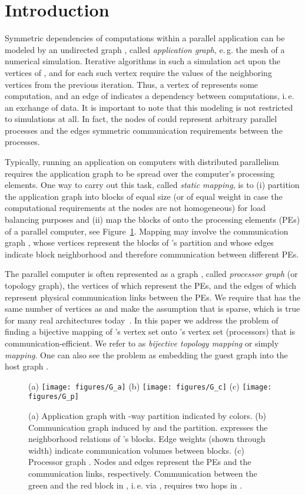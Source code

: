 \documentclass[pdftex]{llncs}
\newcommand{\eg}{e.\,g.\xspace}
\newcommand{\ie}{i.\,e.\xspace}
\begin{document}
\section{Introduction}
\label{sec:intro}
Symmetric dependencies of computations within a parallel application can be modeled by an
undirected graph , called \emph{application graph}, \eg the
mesh of a numerical simulation. Iterative algorithms in such a
simulation act upon the vertices of , and for each such vertex
require the values of the neighboring vertices from the previous
iteration. Thus, a vertex of  represents some computation, and an
edge of  indicates a dependency between computations, \ie
an exchange of data. It is important to note that this modeling is not restricted 
to simulations at all. In fact, the nodes of  could represent arbitrary parallel processes
and the edges symmetric communication requirements between the processes.

Typically, running an application on computers with distributed parallelism requires the application graph to be spread over 
the computer's processing elements. One
way to carry out this task, called \emph{static mapping}, is to (i)
partition the application graph  into blocks of equal size (or of equal weight
in case the computational requirements at the nodes are not homogeneous) for
load balancing purposes and (ii) map the blocks of  onto the
processing elements (PEs) of a parallel computer, see
Figure~\ref{fig:overview}. 
Mapping may involve the communication
graph , whose vertices represent the blocks of 's
partition and whose edges indicate block neighborhood and therefore
communication between different PEs. 

The parallel computer is often represented as a graph , called \emph{processor
  graph} (or topology graph), the vertices of which represent the PEs,
and the edges of which represent physical communication links between
the PEs. We require that  has the same number of vertices as
 and make the assumption that  is sparse,
which is true for many real architectures today~\cite{top500-13-06}.
In this paper we address the problem of finding a bijective mapping
 of 's vertex set onto 's vertex set
(processors) that is communication-efficient. We refer to  as
\emph{bijective topology mapping} or simply \emph{mapping}. One can also
see the problem as embedding the guest graph  into the host graph .


\begin{figure}[tb]
\centering{}(a) \texttt{[image: figures/G\_a]} (b)
\texttt{[image: figures/G\_c]} (c)
\texttt{[image: figures/G\_p]}\caption{\label{fig:overview}(a)
  Application graph  with -way partition indicated by
  colors. (b) Com\-mu\-ni\-ca\-tion graph  induced by 
  and the partition.  expresses the neighborhood relations of
  's blocks. Edge weights (shown through width) indicate
  communication volumes between blocks. (c) Processor graph .
  Nodes and edges represent the PEs and the communication links,
  respectively. Com\-mu\-ni\-ca\-tion between the green and the red
  block in , \ie via , requires two hops in .  }
\vspace{-3ex}
\end{figure}
\end{document}
